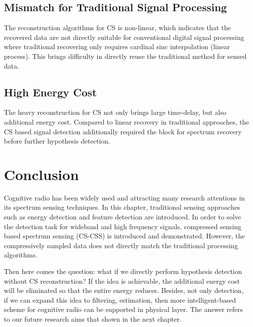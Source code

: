 \subsection{Mismatch for Traditional Signal Processing}
The reconstruction algorithms for CS is non-linear, which indicates that the recovered data are not directly suitable for conventional digital signal processing where traditional recovering only requires cardinal sinc interpolation (linear process). This brings difficulty in directly reuse the traditional method for sensed data.

\subsection{High Energy Cost}
The heavy reconstruction for CS not only brings large time-delay, but also additional energy cost. Compared to linear recovery in traditional approaches, the CS based signal detection additionally required the block for spectrum recovery before further hypothesis detection. 

\section{Conclusion}
Cognitive radio has been widely used and attracting many research attentions in its spectrum sensing techniques. In this chapter, traditional sensing approaches such as energy detection and feature detection are introduced. In order to solve the detection task for wideband and high frequency signals, compressed sensing based spectrum sensing (CS-CSS) is introduced and demonstrated. However, the compressively sampled data does not directly match the traditional processing algorithms.

Then here comes the question: what if we directly perform hypothesis detection without CS reconstruction? If the idea is achievable, the additional energy cost will be eliminated so that the entire energy reduces. Besides, not only detection, if we can expand this idea to filtering, estimation, then more intelligent-based scheme for cognitive radio can be supported in physical layer. The answer refers to our future research aims that shown in the next chapter.


